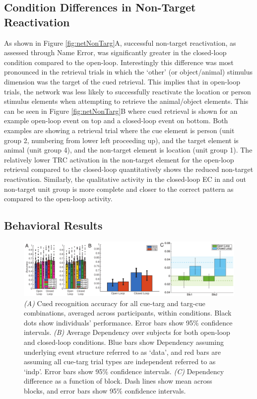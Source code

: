 \documentclass[11pt, titlepage, twoside]{article}
\begin{document}
\subsection{Condition Differences in Non-Target Reactivation}
As shown in Figure \ref{fig:netNonTarg}A, successful non-target reactivation, as assessed through Name Error, was significantly greater in the closed-loop condition compared to the open-loop.  Interestingly this difference was most pronounced in the retrieval trials in which the `other' (or object/animal) stimulus dimension was the target of the cued retrieval.  This implies that in open-loop trials, the network was less likely to successfully reactivate  the location or person stimulus elements when attempting to retrieve the animal/object elements.  This can be seen in Figure \ref{fig:netNonTarg}B where cued retrieval is shown for an example open-loop event on top and a closed-loop event on bottom.  Both examples are showing a retrieval trial where the cue element is person (unit group 2, numbering from lower left proceeding up), and the target element is animal (unit group 4), and the non-target element is location (unit group 1).  The relatively lower TRC activation in the non-target element for the open-loop retrieval compared to the closed-loop quantitatively shows the reduced non-target reactivation.  Similarly, the qualitative activity in the closed-loop EC in and out non-target unit group is more complete and closer to the correct pattern as compared to the open-loop activity.


\subsection{Behavioral Results}\label{sec:eegresults}


\begin{figure}
	\begin{center}
		\includegraphics[width=\textwidth]{figs/deevEEGBeh_edit.pdf}
	\end{center}
	\caption[EEG Dependent Events Behavior]{
		\emph{(A)} Cued recognition accuracy for all cue-targ and targ-cue combinations, averaged across participants, within conditions. Black dots show individuals' performance.  Error bars show 95\% confidence intervals. 
		\emph{(B)} Average Dependency over subjects for both open-loop and closed-loop conditions.  Blue bars show Dependency assuming underlying event structure referred to as `data', and red bars are assuming all cue-targ trial types are independent referred to as `indp'. Error bars show 95\% confidence intervals. 
		\emph{(C)} Dependency difference as a function of block.   Dash lines show mean across blocks, and error bars show 95\% confidence intervals.
	}
	\label{fig:deevEEGBeh}
\end{figure}
\end{document}
